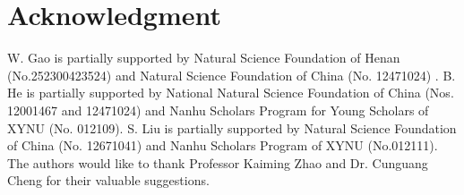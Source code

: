 \documentclass[12pt,reqno]{article}
\begin{document}
\section* {Acknowledgment} 

 W. Gao is partially supported by  Natural Science Foundation of Henan (No.252300423524) and Natural Science Foundation of China (No. 12471024) .
 B. He is partially supported by  National Natural Science Foundation of China (Nos. 12001467 and 12471024) and Nanhu Scholars Program for Young Scholars of XYNU (No. 012109).
  S. Liu is partially supported by Natural Science Foundation of China (No. 12671041) and Nanhu Scholars Program of XYNU (No.012111). The authors would like to thank Professor Kaiming Zhao and Dr. Cunguang Cheng for their valuable suggestions.
 
\end{document}
